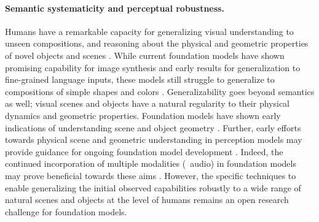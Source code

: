 \paragraph{Semantic systematicity and perceptual robustness.} Humans have a remarkable capacity for generalizing visual understanding to unseen compositions, and reasoning about the physical and geometric properties of novel objects and scenes \cite{lake2015human}. While current foundation models have shown promising capability for image synthesis and early results for generalization to fine-grained language inputs, these models still struggle to generalize to compositions of simple shapes and colors \cite{ramesh2021zeroshot,radford2021learning,rong2021extrapolating}. Generalizability goes beyond semantics as well; visual scenes and objects have a natural regularity to their physical dynamics and geometric properties. Foundation models have shown early indications of understanding scene and object geometry \cite{ramesh2021zeroshot}. Further, early efforts towards physical scene and geometric understanding in perception models may provide guidance for ongoing foundation model development \cite{yi2019clevrer, bakhtin2019phyre, li2020visual}. Indeed, the continued incorporation of multiple modalities (\eg~audio) in foundation models may prove beneficial towards these aims \cite{zhang2017shape,gao2020visualechoes,jaegle2021perceiverio}. However, the specific techniques to enable generalizing the initial observed capabilities robustly to a wide range of natural scenes and objects at the level of humans remains an open research challenge for foundation models.

